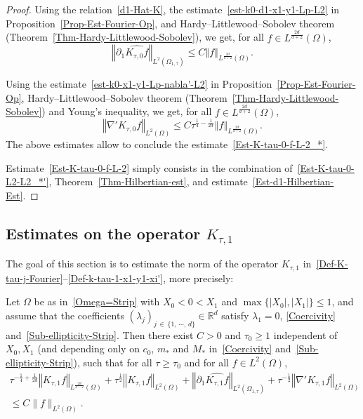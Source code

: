 \documentclass[10pt]{amsart}
\theoremstyle{definition}\newtheorem{defi}[theo]{Definition}\newtheorem{rema}[theo]{Remark}\newtheorem{exam}[theo]{Example}\newtheorem{exem}[theo]{Example}\newtheorem{nota}[theo]{Notation}
\newcommand*\R{\mathbb{R}}
\newcommand{\norm}[1]{\left\Vert#1\right\Vert}
\renewcommand{\leq}{\leqslant}
\renewcommand{\geq}{\geqslant}
\begin{document}
\begin{proof}
Using the relation~\eqref{d1-Hat-K}, the estimate~\eqref{est-k0-d1-x1-y1-Lp-L2} in Proposition~\ref{Prop-Est-Fourier-Op}, and Hardy--Little\-wood--Sobolev theorem (Theorem~\ref{Thm-Hardy-Littlewood-Sobolev}), we get, for all $f \in L^{\frac{2d}{d+2}}(\Omega)$,
\begin{equation*}
\norm{\partial_1 \widehat{ K_{\tau,0} f}}_{L^2(\Omega_{1, \tau})}
\leq C \norm{f}_{L^{\frac{2d}{d+2}}(\Omega)}.
\end{equation*}

Using the estimate~\eqref{est-k0-x1-y1-Lp-nabla'-L2} in Proposition~\ref{Prop-Est-Fourier-Op}, Hardy--Littlewood--Sobolev theorem (Theorem~\ref{Thm-Hardy-Littlewood-Sobolev}) and Young's inequality, we get, for all $f \in L^{\frac{2d}{d+2}}(\Omega)$,
\begin{equation*}
\norm{\nabla' K_{\tau, 0} f}_{L^{2}(\Omega)}
\leq C{\tau^{\frac{1}{4}-\frac{1}{2d}}} \norm{f}_{L^{\frac{2d}{d+2}}(\Omega)}.
\end{equation*}
The above estimates allow to conclude the estimate~\eqref{Est-K-tau-0-f-L-2_*}.

Estimate~\eqref{Est-K-tau-0-f-L-2} simply consists in the combination of~\eqref{Est-K-tau-0-L2-L2_*'}, Theorem~\ref{Thm-Hilbertian-est}, and estimate~\eqref{Est-d1-Hilbertian-Est}.
\end{proof}



\subsection{Estimates on the operator \texorpdfstring{$K_{\tau, 1}$}{K tau, 1}} The goal of this section is to estimate the norm of the operator $K_{\tau, 1}$ in~\eqref{Def-K-tau-j-Fourier}--\eqref{Def-k-tau-1-x1-y1-xi'}, more precisely:
\begin{prop}\label{Prop-OpNorm-Est-K1}
Let $\Omega$ be as in~\eqref{Omega=Strip} with $X_0 \! <\! 0\! <\! X_1$ and $\max\{|X_0|, |X_1|\} \leq 1$, and assume that the coefficients $(\lambda_j)_{j\, \in\,\{1,\,\cdots,\,d\}} \in \R^d$ satisfy $\lambda_1 = 0$, \eqref{Coercivity} and~\eqref{Sub-ellipticity-Strip}. Then there exist $C>0$ and $\tau_0 \geq 1$ independent of $X_0, X_1$ (and depending only on $c_0$, $m_*$ and $M_*$ in~\eqref{Coercivity} and~\eqref{Sub-ellipticity-Strip}), such that for all $\tau \geq \tau_0$ and for all $f \in L^2(\Omega)$,
\begin{multline*}
\tau^{-\frac{1}{4}+\frac{1}{2d}}\norm{ K_{\tau,1} f}_{L^{\frac{2d}{d-2}}(\Omega)} +
\tau^{\frac{1}{2}} \norm{K_{\tau,1} f}_{L^{2}(\Omega)} +
\norm{\partial_1 \widehat{ K_{\tau,1} f}}_{L^2(\Omega_{1, \tau})} +
\tau^{-\frac{1}{2}} \norm{\nabla' K_{\tau,1} f}_{L^2(\Omega)} \\
\leq C \| f \|_{L^2(\Omega)}.
\end{multline*}
\end{prop}
\end{document}
